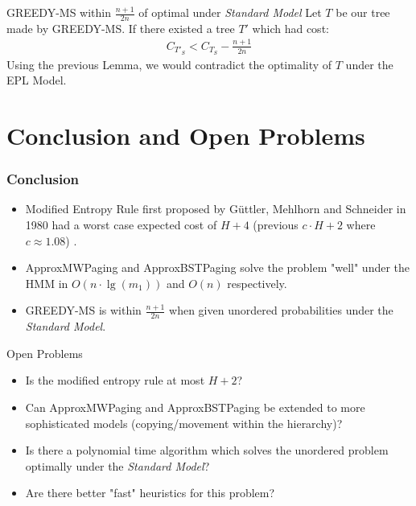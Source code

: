 \documentclass{beamer}
\theoremstyle{plain}
\begin{document}
\begin{frame}{GREEDY-MS within $\frac{n+1}{2n}$ of optimal under \textit{Standard Model}}
Let $T$ be our tree made by GREEDY-MS. If there existed a tree $T'$ which had cost:
\begin{align*}
C_{T'_S} < C_{T_S} - \frac{n+1}{2n}
\end{align*}
Using the previous Lemma, we would contradict the optimality of $T$ under the EPL Model.
\end{frame}





\section{Conclusion and Open Problems} \label{Conclusion and Open Problems}

\begin{frame} \frametitle{Conclusion}
\begin{itemize}
\item Modified Entropy Rule first proposed by  G{\"u}ttler, Mehlhorn and Schneider in 1980 had a worst case expected cost of $H+4$ (previous $c\cdot H+2$ where $c \approx 1.08$) \cite{guttler1980binary}.

\item ApproxMWPaging and ApproxBSTPaging solve the problem "well" under the HMM in $O(n\cdot \lg(m_1))$ and $O(n)$ respectively.

\item GREEDY-MS is within $\frac{n+1}{2n}$ when given unordered probabilities under the \textit{Standard Model}.   
\end{itemize}

\end{frame}


\begin{frame}{Open Problems}
\begin{itemize}
\item Is the modified entropy rule at most $H+2$?
\item Can ApproxMWPaging and ApproxBSTPaging be extended to more sophisticated models (copying/movement within the hierarchy)?
\item Is there a polynomial time algorithm which solves the unordered problem optimally under the \textit{Standard Model}?
\item Are there better "fast" heuristics for this problem?
\end{itemize}
\end{frame}
\end{document}
